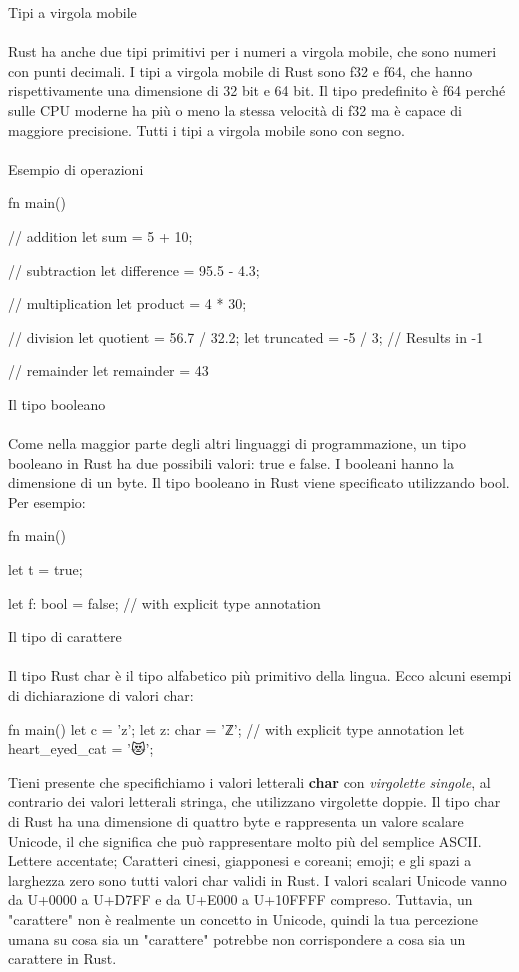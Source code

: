 \documentclass[11pt,a4paper]{article}
\begin{document}
Tipi a virgola mobile\\
\\
Rust ha anche due tipi primitivi per i numeri a virgola mobile, che sono numeri con punti decimali. I tipi a virgola mobile di Rust sono f32 e f64, che hanno rispettivamente una dimensione di 32 bit e 64 bit. Il tipo predefinito è f64 perché sulle CPU moderne ha più o meno la stessa velocità di f32 ma è capace di maggiore precisione. Tutti i tipi a virgola mobile sono con segno.\\
\\
Esempio di operazioni

\begin{rust}
fn main() {
    // addition
    let sum = 5 + 10;

    // subtraction
    let difference = 95.5 - 4.3;

    // multiplication
    let product = 4 * 30;

    // division
    let quotient = 56.7 / 32.2;
    let truncated = -5 / 3; // Results in -1

    // remainder
    let remainder = 43 %
}

\end{rust}

Il tipo booleano\\
\\
Come nella maggior parte degli altri linguaggi di programmazione, un tipo booleano in Rust ha due possibili valori: \textcolor{deepred}{true} e \textcolor{deepred}{false}. I booleani hanno la dimensione di un byte. Il tipo booleano in Rust viene specificato utilizzando bool. Per esempio:
\begin{rust}
fn main() {
    let t = true;

    let f: bool = false; // with explicit type annotation
}
\end{rust}

Il tipo di carattere\\
\\
Il tipo Rust \textcolor{deepred}{char} è il tipo alfabetico più primitivo della lingua. Ecco alcuni esempi di dichiarazione di valori char:
\begin{rust}
fn main() {
    let c = 'z';
    let z: char = 'ℤ'; // with explicit type annotation
    let heart_eyed_cat = '😻';
}
\end{rust}

Tieni presente che specifichiamo i valori letterali \textbf{char} con \textit{virgolette singole}, al contrario dei valori letterali stringa, che utilizzano virgolette doppie. Il tipo char di Rust ha una dimensione di quattro byte e rappresenta un valore scalare Unicode, il che significa che può rappresentare molto più del semplice ASCII. Lettere accentate; Caratteri cinesi, giapponesi e coreani; emoji; e gli spazi a larghezza zero sono tutti valori char validi in Rust. I valori scalari Unicode vanno da U+0000 a U+D7FF e da U+E000 a U+10FFFF compreso. Tuttavia, un "carattere" non è realmente un concetto in Unicode, quindi la tua percezione umana su cosa sia un "carattere" potrebbe non corrispondere a cosa sia un carattere in Rust.
\end{document}
